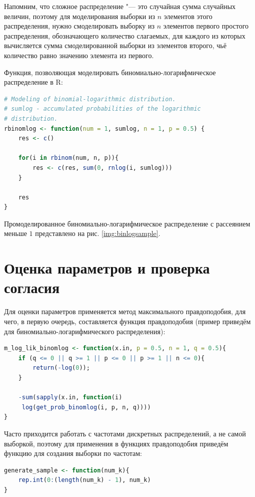 \documentclass[12pt, specialist, subf, substylefile = spbu.rtx]{disser}
\begin{document}
	Напомним, что сложное распределение "--- это случайная сумма случайных величин, поэтому для моделирования выборки из $ n $ элементов этого распределения, нужно смоделировать выборку из $ n $ элементов первого простого распределения, обозначающего количество слагаемых, для каждого из которых вычисляется сумма смоделированной выборки из элементов второго, чьё количество равно значению элемента из первого.
	
	Функция, позволяющая моделировать биномиально-логарифмическое распределение в R:
	\begin{lstlisting}[language=R]
# Modeling of binomial-logarithmic distribution.
# sumlog - accumulated probabilities of the logarithmic
# distribution.
rbinomlog <- function(num = 1, sumlog, n = 1, p = 0.5) {
	res <- c()
	
	for(i in rbinom(num, n, p)){
		res <- c(res, sum(0, rnlog(i, sumlog)))
	}
	
	res
}
	\end{lstlisting}
	\label{page:Rmodel}
	Промоделированное биномиально-логарифмическое распределение с рассеянием меньше $ 1 $ представлено на рис. \ref{img:binlogsample}.
	
	\section{Оценка параметров и проверка согласия}
	
	Для оценки параметров применяется метод максимального правдоподобия, для чего, в первую очередь, составляется функция правдоподобия (пример приведём для биномиально-логарифмического распределения):
	
	\begin{lstlisting}[language=R]
m_log_lik_binomlog <- function(x.in, p = 0.5, n = 1, q = 0.5){
	if (q <= 0 || q >= 1 || p <= 0 || p >= 1 || n <= 0){
		return(-log(0));
	}
	
	-sum(sapply(x.in, function(i)
	 log(get_prob_binomlog(i, p, n, q))))
}
	\end{lstlisting}

	Часто приходится работать с частотами дискретных распределений, а не самой выборкой, поэтому для применения в функциях правдоподобия приведём функцию для создания выборки по частотам:
	
\begin{lstlisting}[language=R]
generate_sample <- function(num_k){
	rep.int(0:(length(num_k) - 1), num_k)
}
\end{lstlisting}	
\end{document}
